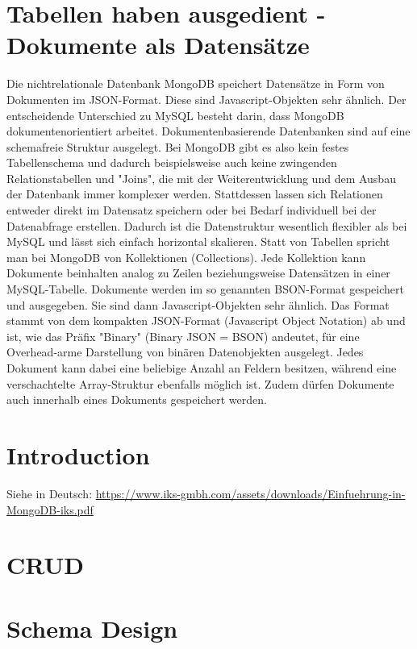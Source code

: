 \section{Tabellen haben ausgedient - Dokumente als Datensätze}
Die nichtrelationale Datenbank MongoDB speichert Datensätze in Form von Dokumenten im JSON-Format. Diese sind Javascript-Objekten sehr ähnlich. Der entscheidende Unterschied zu MySQL besteht darin, dass MongoDB dokumentenorientiert arbeitet. Dokumentenbasierende Datenbanken sind auf eine schemafreie Struktur ausgelegt. Bei MongoDB gibt es also kein festes Tabellenschema und dadurch beispielsweise auch keine zwingenden Relationstabellen und "Joins", die mit der Weiterentwicklung und dem Ausbau der Datenbank immer komplexer werden. Stattdessen lassen sich Relationen entweder direkt im Datensatz speichern oder bei Bedarf individuell bei der Datenabfrage erstellen. Dadurch ist die Datenstruktur wesentlich flexibler als bei MySQL und lässt sich einfach horizontal skalieren.\newline\newline
Statt von Tabellen spricht man bei MongoDB von Kollektionen (Collections). Jede Kollektion kann Dokumente beinhalten analog zu Zeilen beziehungsweise Datensätzen in einer MySQL-Tabelle. Dokumente werden im so genannten BSON-Format gespeichert und ausgegeben. Sie sind dann Javascript-Objekten sehr ähnlich. Das Format stammt von dem kompakten JSON-Format (Javascript Object Notation) ab und ist, wie das Präfix "Binary" (Binary JSON = BSON) andeutet, für eine Overhead-arme Darstellung von binären Datenobjekten ausgelegt. Jedes Dokument kann dabei eine beliebige Anzahl an Feldern besitzen, während eine verschachtelte Array-Struktur ebenfalls möglich ist. Zudem dürfen Dokumente auch innerhalb eines Dokuments gespeichert werden.



\section{Introduction}
Siehe in Deutsch: \url{https://www.iks-gmbh.com/assets/downloads/Einfuehrung-in-MongoDB-iks.pdf}\newline
\section{CRUD}
\section{Schema Design}
